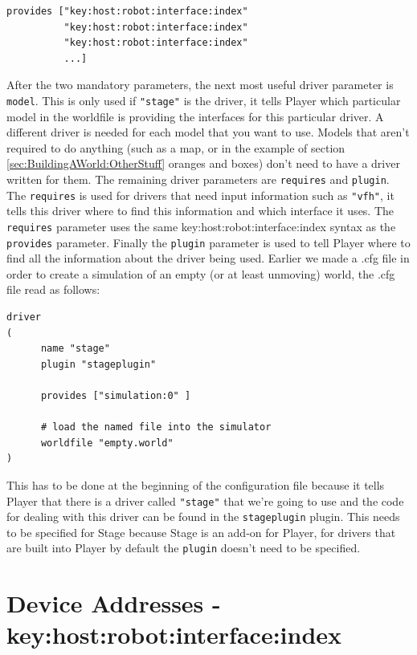 \documentclass[a4paper]{report}
\newcommand{\pl}{Player\xspace}
\begin{document}
\begin{verbatim}
provides ["key:host:robot:interface:index" 
          "key:host:robot:interface:index"
          "key:host:robot:interface:index"
          ...]
\end{verbatim}

After the two mandatory parameters, the next most useful driver parameter is \verb|model|. This is only used if \verb|"stage"| is the driver, it tells \pl which particular model in the worldfile is providing the interfaces for this particular driver. A different driver is needed for each model that you want to use. 
Models that aren't required to do anything (such as a map, or in the example of section \ref{sec:BuildingAWorld:OtherStuff} oranges and boxes) don't need to have a driver written for them.\newline
The remaining driver parameters are \verb|requires| and \verb|plugin|. The \verb|requires| is used for drivers that need input information such as \verb|"vfh"|, it tells this driver where to find this information and which interface it uses. 
The \verb|requires| parameter uses the same key:host:robot:interface:index syntax as the \verb|provides| parameter. Finally the \verb|plugin| parameter is used to tell \pl where to find all the information about the driver being used. 
Earlier we made a .cfg file in order to create a simulation of an empty (or at least unmoving) world, the .cfg file read as follows:
\begin{verbatim}
driver
(		
      name "stage"
      plugin "stageplugin"

      provides ["simulation:0" ]

      # load the named file into the simulator
      worldfile "empty.world"	
)
\end{verbatim}
This has to be done at the beginning of the configuration file because it tells \pl that there is a driver called \verb|"stage"| that we're going to use and the code for dealing with this driver can be found in the \verb|stageplugin| plugin. This needs to be specified for Stage because Stage is an add-on for \pl, for drivers that are built into \pl by default the \verb|plugin| doesn't need to be specified.

\section{Device Addresses - key:host:robot:interface:index} \label{sec:ConfigurationFile:DeviceAddress}
\end{document}

